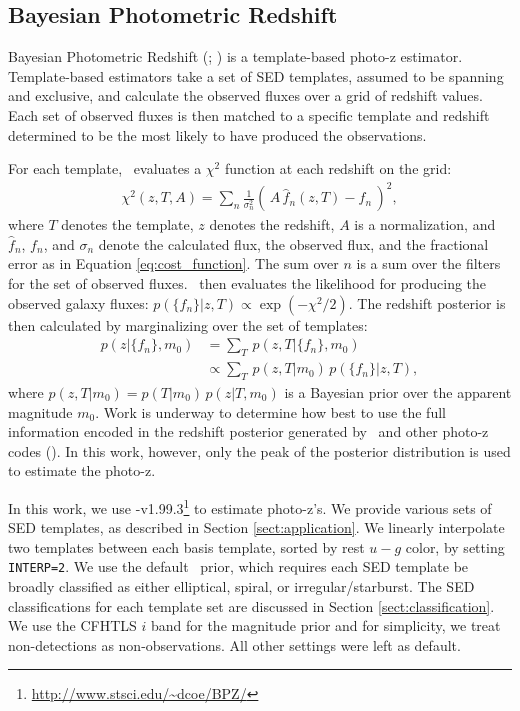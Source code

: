 
\label{sect:photoz}

\subsection{Bayesian Photometric Redshift}
\label{sect:bpz}
        
Bayesian Photometric Redshift (\bpz; \citealt{Benitez2000a}) is a template-based photo-z estimator.
Template-based estimators take a set of SED templates, assumed to be spanning and exclusive, and calculate the observed fluxes over a grid of redshift values. 
Each set of observed fluxes is then matched to a specific template and redshift determined to be the most likely to have produced the observations. 

For each template, \bpz\ evaluates a $\chi^2$ function at each redshift on the grid:
\begin{align}
    \chi^2 (z,T,A) = \sum_n \frac{1}{\sigma_n^2} (\, A \, \hat{f}_n(z,T) - f_n \,)^2,
    \label{eq:chi2}
\end{align}
where $T$ denotes the template, $z$ denotes the redshift, $A$ is a normalization, and $\hat{f}_n$, $f_n$, and $\sigma_n$ denote the calculated flux, the observed flux, and the fractional error as in Equation \ref{eq:cost_function}. 
The sum over $n$ is a sum over the filters for the set of observed fluxes. 
\bpz\ then evaluates the likelihood for producing the observed galaxy fluxes: $p(\{f_n\}|z,T) \propto \exp{(-\chi^2/2)}$. 
The redshift posterior is then calculated by marginalizing over the set of templates:
\begin{align}
    p(z|\{f_n\},m_0) &= \sum_T \, p(z,T|\{f_n\},m_0) \nonumber \\
                     &\propto \sum_T \, p(z,T|m_0) \, p(\{f_n\}|z,T),
\end{align}
where $p(z,T|m_0) = p(T|m_0) \, p(z|T,m_0)$ is a Bayesian prior over the apparent magnitude $m_0$. 
Work is underway to determine how best to use the full information encoded in the redshift posterior generated by \bpz\ and other photo-z codes (). 
In this work, however, only the peak of the posterior distribution is used to estimate the photo-z.

In this work, we use \bpz-v1.99.3\footnote{\url{http://www.stsci.edu/~dcoe/BPZ/}} \citep{Benitez2000a} to estimate photo-z's. 
We provide various sets of SED templates, as described in Section \ref{sect:application}. 
We linearly interpolate two templates between each basis template, sorted by rest $u-g$ color, by setting \texttt{INTERP=2}. 
We use the default \bpz\ prior, which requires each SED template be broadly classified as either elliptical, spiral, or irregular/starburst. 
The SED classifications for each template set are discussed in Section \ref{sect:classification}. 
We use the CFHTLS $i$ band for the magnitude prior and for simplicity, we treat non-detections as non-observations.
All other settings were left as default.

